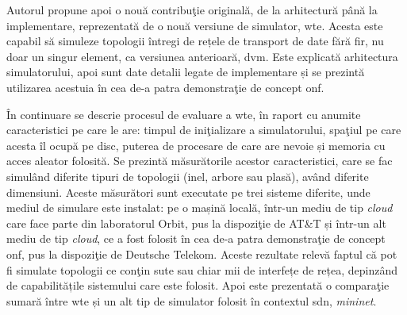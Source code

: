 Autorul propune apoi o nouă contribuţie originală, de la arhitectură până la implementare, reprezentată de o nouă versiune de simulator, \gls{wte}. Acesta este capabil să simuleze topologii întregi de rețele de transport de date fără fir, nu doar un singur element, ca versiunea anterioară, \gls{dvm}. Este explicată arhitectura simulatorului, apoi sunt date detalii legate de implementare și se prezintă utilizarea acestuia în cea de-a patra demonstraţie de concept \gls{onf}.

În continuare se descrie procesul de evaluare a \gls{wte}, în raport cu anumite caracteristici pe care le are: timpul de iniţializare a simulatorului, spaţiul pe care acesta îl ocupă pe disc, puterea de procesare de care are nevoie și memoria cu acces aleator folosită. Se prezintă măsurătorile acestor caracteristici, care se fac simulând diferite tipuri de topologii (inel, arbore sau plasă), având diferite dimensiuni. Aceste măsurători sunt executate pe trei sisteme diferite, unde mediul de simulare este instalat: pe o mașină locală, într-un mediu de tip \textit{cloud} care face parte din laboratorul Orbit, pus la dispoziţie de AT\&T și într-un alt mediu de tip \textit{cloud}, ce a fost folosit în cea de-a patra demonstraţie de concept \gls{onf}, pus la dispoziţie de Deutsche Telekom. Aceste rezultate relevă faptul că pot fi simulate topologii ce conţin sute sau chiar mii de interfețe de rețea, depinzând de capabilitățile sistemului care este folosit. Apoi este prezentată o comparaţie sumară între \gls{wte} și un alt tip de simulator folosit în contextul \gls{sdn}, \textit{mininet}.





